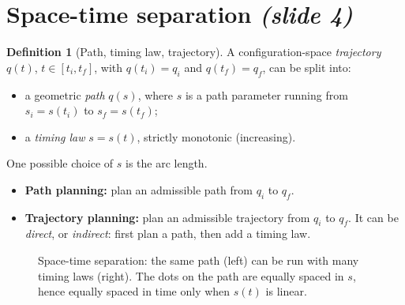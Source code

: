 \documentclass[11pt,a4paper]{article}
\def\boldsymbol#1{#1}%
\newcommand{\q}{\boldsymbol{q}}
\newcommand{\qi}{\boldsymbol{q}_i}
\newcommand{\qf}{\boldsymbol{q}_f}
\newcommand{\bx}{\boldsymbol{x}}
\newcommand{\by}{\boldsymbol{y}}
\theoremstyle{definition}
\newtheorem{definition}{Definition}[section]
\theoremstyle{plain}
\theoremstyle{remark}
\begin{document}
\section{Space-time separation \emph{(slide 4)}}

\begin{definition}[Path, timing law, trajectory]
A configuration-space \emph{trajectory} $\q(t)$, $t\in[t_i,t_f]$, with $\q(t_i)=\qi$ and $\q(t_f)=\qf$, can be split into:
\begin{itemize}[nosep]
\item a geometric \emph{path} $\q(s)$, where $s$ is a path parameter running from $s_i=s(t_i)$ to $s_f=s(t_f)$;
\item a \emph{timing law} $s=s(t)$, strictly monotonic (increasing).
\end{itemize}
One possible choice of $s$ is the arc length.
\end{definition}

\begin{itemize}
\item \textbf{Path planning:} plan an admissible path from $\qi$ to $\qf$.
\item \textbf{Trajectory planning:} plan an admissible trajectory from $\qi$ to $\qf$. It can be
\emph{direct}, or \emph{indirect}: first plan a path, then add a timing law.
\end{itemize}

\begin{figure}[h]
\centering
{}
\caption{Space-time separation: the same path (left) can be run with many timing laws (right). The dots on the path
are equally spaced in $s$, hence equally spaced in time only when $s(t)$ is linear.}
\end{figure}
\end{document}
